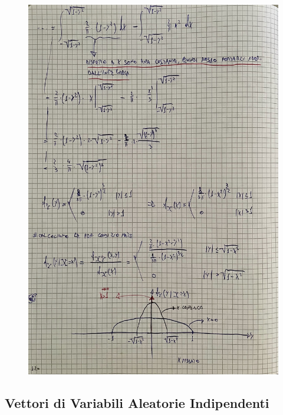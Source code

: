 \documentclass{article}
\begin{document}
\begin{figure}[ht]
\centering
\includegraphics[scale=0.14]{ese/44a.jpeg}
\end{figure} 

\subsection{Vettori di Variabili Aleatorie Indipendenti}
\end{document}
